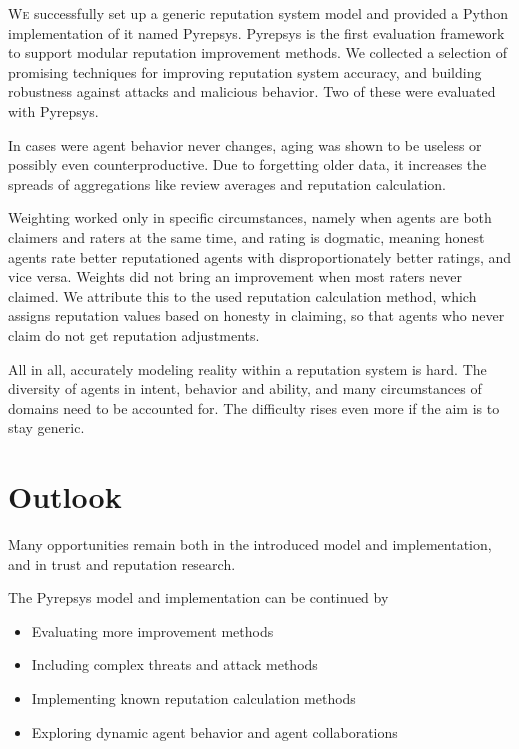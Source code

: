 \documentclass[%
    ]{\PathToTumTemplate/thesis/tum_thesis}
\begin{document}
 
\lettrine{W}{e} successfully set up a generic reputation system model and provided a Python implementation of it named Pyrepsys.
Pyrepsys is the first evaluation framework to support modular reputation improvement methods.
We collected a selection of promising techniques for improving reputation system accuracy, and building robustness against attacks and malicious behavior.
Two of these were evaluated with Pyrepsys.

In cases were agent behavior never changes, aging was shown to be useless or possibly even counterproductive.
Due to forgetting older data, it increases the spreads of aggregations like review averages and reputation calculation.

Weighting worked only in specific circumstances, namely when agents are both claimers and raters at the same time, and rating is dogmatic, meaning honest agents rate better reputationed agents with disproportionately better ratings, and vice versa.
Weights did not bring an improvement when most raters never claimed.
We attribute this to the used reputation calculation method, which assigns reputation values based on honesty in claiming, so that agents who never claim do not get reputation adjustments.

All in all, accurately modeling reality within a reputation system is hard.
The diversity of agents in intent, behavior and ability, and many circumstances of domains need to be accounted for.
The difficulty rises even more if the aim is to stay generic.



\section{Outlook}\label{sec:outlook}

Many opportunities remain both in the introduced model and implementation, and in trust and reputation research.

The Pyrepsys model and implementation can be continued by
\begin{itemize}
	\item Evaluating more improvement methods
	\item Including complex threats and attack methods
	\item Implementing known reputation calculation methods
	\item Exploring dynamic agent behavior and agent collaborations
\end{itemize}
\end{document}
